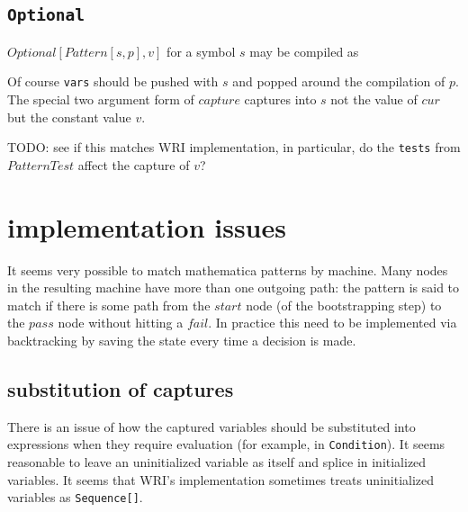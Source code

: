 \documentclass[12 pt]{amsart}
\begin{document}
\subsection{{\tt Optional}}
$Optional[Pattern[s,p],v]$ for a symbol $s$ may be compiled as
\begin{center}
\end{center}
Of course {\tt vars} should be pushed with $s$ and popped around the compilation of $p$. The special two argument form of $capture$ captures into $s$ not the value of $cur$ but the constant value $v$.

TODO: see if this matches WRI implementation, in particular, do the {\tt tests} from $PatternTest$ affect the capture of $v$?

\section{implementation issues}



It seems very possible to match mathematica patterns by machine. Many nodes in the resulting machine have more than one outgoing path: the pattern is said to match if there is some path from the $start$ node (of the bootstrapping step) to the $pass$ node without hitting a $fail$. In practice this need to be implemented via backtracking by saving the state every time a decision is made.

\subsection{substitution of captures}
There is an issue of how the captured variables should be substituted into expressions when they require evaluation (for example, in {\tt Condition}). It seems reasonable to leave an uninitialized variable as itself and splice in initialized variables. It seems that WRI's implementation sometimes treats uninitialized variables as {\tt Sequence[]}.
\end{document}
